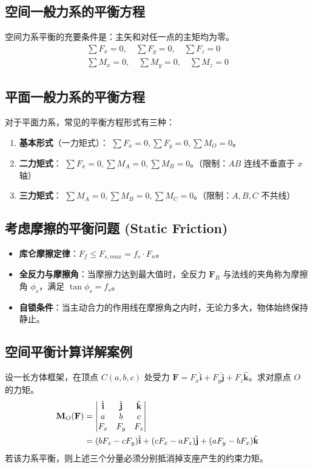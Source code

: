 \documentclass[12pt,a4paper]{article}
\newcommand{\vect}[1]{\mathbf{#1}}                   %
\newcommand{\unitv}[1]{\hat{\mathbf{#1}}}            %
\begin{document}
\subsection{空间一般力系的平衡方程}
空间力系平衡的充要条件是：主矢和对任一点的主矩均为零。
\begin{align}
    \sum F_x = 0, \quad \sum F_y = 0, \quad \sum F_z = 0 \\
    \sum M_x = 0, \quad \sum M_y = 0, \quad \sum M_z = 0
\end{align}

\subsection{平面一般力系的平衡方程}
对于平面力系，常见的平衡方程形式有三种：
\begin{enumerate}
    \item \textbf{基本形式}（一力矩式）：
    $\sum F_x = 0, \sum F_y = 0, \sum M_O = 0$。
    \item \textbf{二力矩式}：
    $\sum F_x = 0, \sum M_A = 0, \sum M_B = 0$。（限制：$AB$ 连线不垂直于 $x$ 轴）
    \item \textbf{三力矩式}：
    $\sum M_A = 0, \sum M_B = 0, \sum M_C = 0$。（限制：$A, B, C$ 不共线）
\end{enumerate}

\subsection{考虑摩擦的平衡问题 (Static Friction)}

\begin{itemize}
    \item \textbf{库仑摩擦定律}：$F_f \leq F_{s,max} = f_s \cdot F_n$。
    \item \textbf{全反力与摩擦角}：当摩擦力达到最大值时，全反力 $\vect{F}_R$ 与法线的夹角称为摩擦角 $\phi_s$，满足 $\tan \phi_s = f_s$。
    \item \textbf{自锁条件}：当主动合力的作用线在摩擦角之内时，无论力多大，物体始终保持静止。
\end{itemize}

\subsection{空间平衡计算详解案例}
设一长方体框架，在顶点 $C(a, b, c)$ 处受力 $\vect{F} = F_x \unitv{i} + F_y \unitv{j} + F_z \unitv{k}$。求对原点 $O$ 的力矩。
\begin{align}
    \vect{M}_O(\vect{F}) &= 
    \begin{vmatrix}
        \unitv{i} & \unitv{j} & \unitv{k} \\
        a & b & c \\
        F_x & F_y & F_z
    \end{vmatrix} \notag \\
    &= (bF_z - cF_y)\unitv{i} + (cF_x - aF_z)\unitv{j} + (aF_y - bF_x)\unitv{k}
\end{align}
若该力系平衡，则上述三个分量必须分别抵消掉支座产生的约束力矩。
\end{document}
